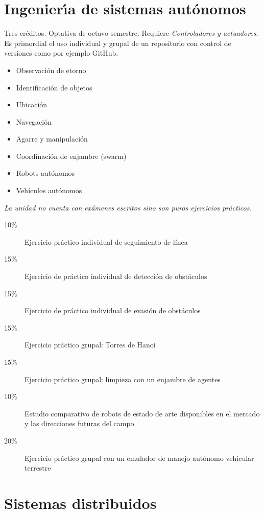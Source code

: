 \documentclass{article}
\begin{document}
\begin{multicols}{4}
\hypertarget{idsa}{\section*{Ingenier\'{\i}a de sistemas
    aut\'{o}nomos}} Tres cr\'{e}ditos. Optativa de octavo
semestre. Requiere {\em Controladores y actuadores}. Es primordial el
uso individual y grupal de un repositorio con control de versiones
como por ejemplo GitHub.

\begin{itemize}
\item{Observaci\'{o}n de etorno}
\item{Identificaci\'{o}n de objetos}
\item{Ubicaci\'{o}n}
\item{Navegaci\'{o}n}
\item{Agarre y manipulaci\'{o}n}
\item{Coordinaci\'{o}n de enjambre (swarm)}
\item{Robots aut\'{o}nomos}
\item{Veh\'{i}culos aut\'{o}nomos}
\end{itemize}

{\em La unidad no cuenta con ex\'{a}menes escritos sino son puros
  ejercicios pr\'{a}cticos.}

\begin{description}
\item[10\%]{Ejercicio pr\'{a}ctico individual de seguimiento de l\'{i}nea}
\item[15\%]{Ejercicio de pr\'{a}ctico individual de detecci\'{o}n de obst\'{a}culos}
\item[15\%]{Ejercicio de pr\'{a}ctico individual de evasi\'{o}n de obst\'{a}culos}  
\item[15\%]{Ejercicio pr\'{a}ctico grupal: Torres de Hanoi}
\item[15\%]{Ejercicio pr\'{a}ctico grupal: limpieza con un enjambre de agentes}  
\item[10\%]{Estudio comparativo de robots de estado de arte
  disponibles en el mercado y las direcciones futuras del campo}
\item[20\%]{Ejercicio pr\'{a}ctico grupal con un emulador de manejo
  aut\'{o}nomo vehicular terrestre}
\end{description}  

\newpage

\hypertarget{sdi}{\section*{Sistemas distribuidos}} 


\end{multicols}
\end{document}
